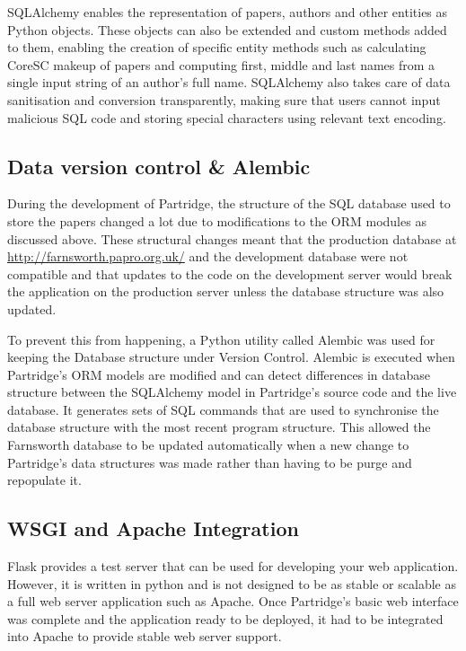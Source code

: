 SQLAlchemy enables the representation of papers, authors and other entities as
Python objects. These objects can also be extended and custom methods added to
them, enabling the creation of specific entity methods such as calculating
CoreSC makeup of papers and computing first, middle and last names from a
single input string of an author's full name. SQLAlchemy also takes care of
data sanitisation and conversion transparently, making sure that users cannot
input malicious SQL code and storing special characters using relevant text
encoding.

\subsection{Data version control \& Alembic}

During the development of Partridge, the structure of the SQL database used to
store the papers changed a lot due to modifications to the ORM modules as
discussed above. These structural changes meant that the production database at
\url{http://farnsworth.papro.org.uk/} and the development database were not
compatible and that updates to the code on the development server would break
the application on the production server unless the database structure was also
updated. 

To prevent this from happening, a Python utility called
Alembic\cite{alembic2013} was used for keeping the Database structure under
Version Control. Alembic is executed when Partridge's ORM models are modified
and can detect differences in database structure between the SQLAlchemy model
in Partridge's source code and the live database. It generates sets of SQL
commands that are used to synchronise the database structure with the most
recent program structure. This allowed the Farnsworth database to be updated
automatically when a new change to Partridge's data structures was made rather
than having to be purge and repopulate it.

\subsection{WSGI and Apache Integration}

Flask provides a test server that can be used for developing your web
application. However, it is written in python and is not designed to be as
stable or scalable as a full web server application such as Apache. Once
Partridge's basic web interface was complete and the application ready to be
deployed, it had to be integrated into Apache to provide stable web server
support.

